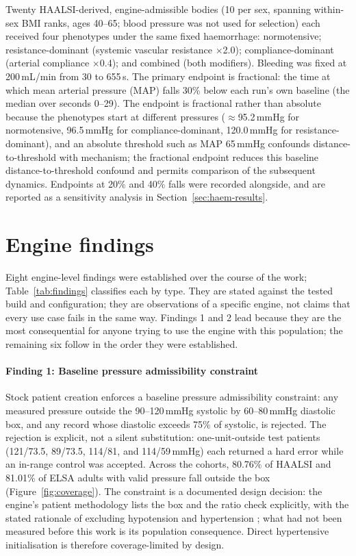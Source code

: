 \documentclass[preprint,12pt,nopreprintline]{elsarticle}
\begin{document}
Twenty HAALSI-derived, engine-admissible bodies (10 per sex, spanning within-sex BMI ranks, ages 40--65; blood pressure was not used for selection) each received four phenotypes under the same fixed haemorrhage: normotensive; resistance-dominant (systemic vascular resistance $\times$2.0); compliance-dominant (arterial compliance $\times$0.4); and combined (both modifiers). Bleeding was fixed at 200\,mL/min from 30 to 655\,s. The primary endpoint is fractional: the time at which mean arterial pressure (MAP) falls 30\% below each run's own baseline (the median over seconds 0--29). The endpoint is fractional rather than absolute because the phenotypes start at different pressures ($\approx$95.2\,mmHg for normotensive, 96.5\,mmHg for compliance-dominant, 120.0\,mmHg for resistance-dominant), and an absolute threshold such as MAP 65\,mmHg confounds distance-to-threshold with mechanism; the fractional endpoint reduces this baseline distance-to-threshold confound and permits comparison of the subsequent dynamics. Endpoints at 20\% and 40\% falls were recorded alongside, and are reported as a sensitivity analysis in Section~\ref{sec:haem-results}.

\section{Engine findings}
\label{sec:findings}

Eight engine-level findings were established over the course of the work; Table~\ref{tab:findings} classifies each by type. They are stated against the tested build and configuration; they are observations of a specific engine, not claims that every use case fails in the same way. Findings 1 and 2 lead because they are the most consequential for anyone trying to use the engine with this population; the remaining six follow in the order they were established.

\paragraph{Finding 1: Baseline pressure admissibility constraint} Stock patient creation enforces a baseline pressure admissibility constraint: any measured pressure outside the 90--120\,mmHg systolic by 60--80\,mmHg diastolic box, and any record whose diastolic exceeds 75\% of systolic, is rejected. The rejection is explicit, not a silent substitution: one-unit-outside test patients (121/73.5, 89/73.5, 114/81, and 114/59\,mmHg) each returned a hard error while an in-range control was accepted. Across the cohorts, 80.76\% of HAALSI and 81.01\% of ELSA adults with valid pressure fall outside the box (Figure~\ref{fig:coverage}). The constraint is a documented design decision: the engine's patient methodology lists the box and the ratio check explicitly, with the stated rationale of excluding hypotension and hypertension \cite{pulsepatient}; what had not been measured before this work is its population consequence. Direct hypertensive initialisation is therefore coverage-limited by design.
\end{document}
